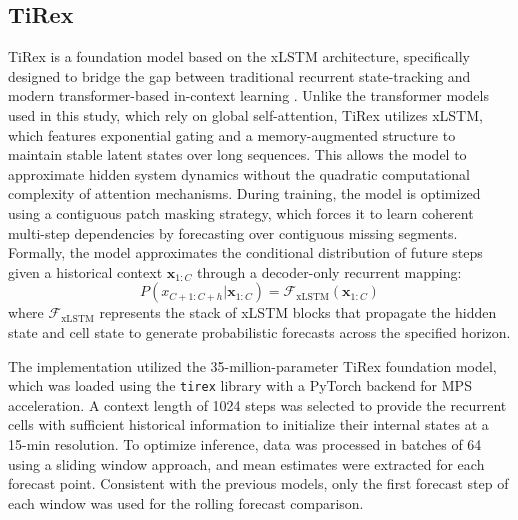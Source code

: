 \documentclass[number, 3p, 10pt, times]{elsarticle}
\begin{document}
\subsection{TiRex}
TiRex is a foundation model based on the xLSTM architecture, specifically designed to bridge the gap between traditional recurrent state-tracking and modern transformer-based in-context learning \citep{Auer2025}. Unlike the transformer models used in this study, which rely on global self-attention, TiRex utilizes xLSTM, which features exponential gating and a memory-augmented structure to maintain stable latent states over long sequences. This allows the model to approximate hidden system dynamics without the quadratic computational complexity of attention mechanisms. During training, the model is optimized using a contiguous patch masking strategy, which forces it to learn coherent multi-step dependencies by forecasting over contiguous missing segments. Formally, the model approximates the conditional distribution of future steps given a historical context $\mathbf{x}_{1:C}$ through a decoder-only recurrent mapping:
\begin{equation}
    P(x_{C+1:C+h} | \mathbf{x}_{1:C}) = \mathcal{F}_{\text{xLSTM}}(\mathbf{x}_{1:C})
\end{equation}
where $\mathcal{F}_{\text{xLSTM}}$ represents the stack of xLSTM blocks that propagate the hidden state and cell state to generate probabilistic forecasts across the specified horizon.

The implementation utilized the 35-million-parameter TiRex foundation model, which was loaded using the \texttt{tirex} library with a PyTorch backend for MPS acceleration. A context length of 1024 steps was selected to provide the recurrent cells with sufficient historical information to initialize their internal states at a 15-min resolution. To optimize inference, data was processed in batches of 64 using a sliding window approach, and mean estimates were extracted for each forecast point. Consistent with the previous models, only the first forecast step of each window was used for the rolling forecast comparison. 
\end{document}
